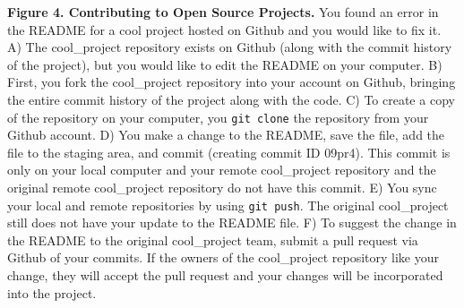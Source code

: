 \textbf{Figure 4. Contributing to Open Source Projects.} You found an error in the README for a cool project hosted on Github and you would like to fix it. A) The cool\_project repository exists on Github (along with the commit history of the project), but you would like to edit the README on your computer. B) First, you fork the cool\_project repository into your account on Github, bringing the entire commit history of the project along with the code. C) To create a copy of the repository on your computer, you \verb|git clone| the repository from your Github account. D) You make a change to the README, save the file, add the file to the staging area, and commit (creating commit ID 09pr4). This commit is only on your local computer and your remote cool\_project repository and the original remote cool\_project repository do not have this commit. E) You sync your local and remote repositories by using \verb|git push|. The original cool\_project still does not have your update to the README file. F) To suggest the change in the README to the original cool\_project team, submit a pull request via Github of your commits. If the owners of the cool\_project repository like your change, they will accept the pull request and your changes will be incorporated into the project. 